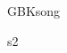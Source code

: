 \documentclass[twoside]{book}
\begin{document}
\begin{CJK*}{GBK}{song}
\begin{thebibliography}{s2}
\end{thebibliography}







\newpage
\clearpage

\backmatter

\printindex

\end{CJK*}
\end{document}
